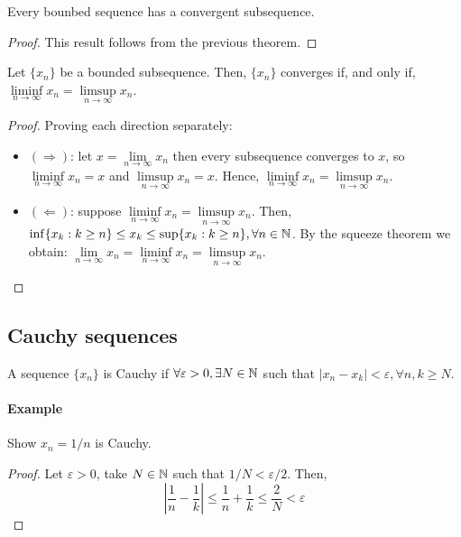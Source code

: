 \begin{theorem}
    Every bounbed sequence has a convergent subsequence.
\end{theorem}

\begin{proof}
    This result follows from the previous theorem.
\end{proof}

\begin{theorem}
    Let $\{x_n\}$ be a bounded subsequence. Then, $\{x_n\}$ converges if, and only if,$\liminf \limits_{n \to \infty} x_n = \limsup \limits_{n \to \infty} x_n$.
\end{theorem}

\begin{proof}
    Proving each direction separately:
    \begin{itemize}
        \item $(\Longrightarrow)$: let $x = \lim \limits_{n \to \infty} x_n$ then every subsequence converges to $x$, so $\liminf \limits_{n \to \infty} x_n = x$ and $\limsup \limits_{n \to \infty} x_n = x$. Hence, $\liminf \limits_{n \to \infty} x_n = \limsup \limits_{n \to \infty} x_n$.
        \item $(\Longleftarrow)$: suppose $\liminf \limits_{n \to \infty} x_n= \limsup \limits_{n \to \infty} x_n$. Then, $\inf \{ x_k: k \geq n\} \leq x_k \leq \sup \{x_k: k \geq n\}, \forall n \in \mathbb{N}$. By the squeeze theorem we obtain: $\lim \limits_{n \to \infty} x_n  = \liminf \limits_{n \to \infty} x_n = \limsup \limits_{n \to \infty} x_n$.
    \end{itemize}
\end{proof}

\subsection{Cauchy sequences}

\begin{definition}
    A sequence $\{x_n\}$ is Cauchy if $\forall \varepsilon > 0, \exists N \in \mathbb{N}$ such that $|x_n-x_k| < \varepsilon, \forall n,k \geq N$.
\end{definition}

\paragraph{Example} Show $x_n = 1/n$ is Cauchy.
\begin{proof}
    Let $\varepsilon > 0$, take $N \in \mathbb{N}$ such that $1/N < \varepsilon/2$. Then,
    \begin{equation*}
        \left |
            \frac{1}{n} - \frac{1}{k}
        \right | \leq
        \frac{1}{n} + \frac{1}{k} \leq
        \frac{2}{N} < \varepsilon
    \end{equation*} 
\end{proof}

